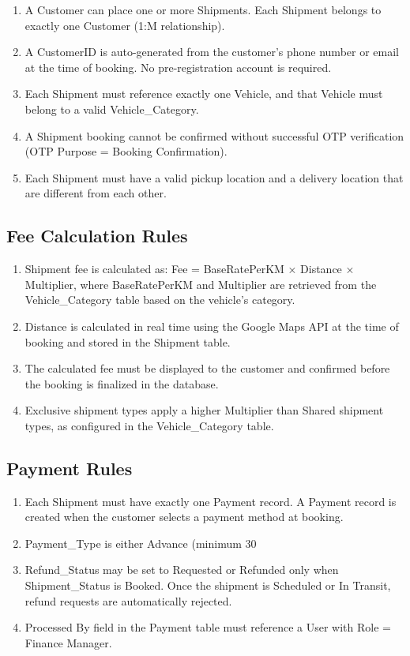 \documentclass[12pt,a4paper]{report}
\begin{document}
\begin{enumerate}
\item A Customer can place one or more Shipments. Each Shipment belongs to exactly one Customer (1:M relationship).
\item A CustomerID is auto-generated from the customer's phone number or email at the time of booking. No pre-registration account is required.
\item Each Shipment must reference exactly one Vehicle, and that Vehicle must belong to a valid Vehicle\_Category.
\item A Shipment booking cannot be confirmed without successful OTP verification (OTP Purpose = Booking Confirmation).
\item Each Shipment must have a valid pickup location and a delivery location that are different from each other.
\end{enumerate}
\subsection{Fee Calculation Rules}
\begin{enumerate}
    \item Shipment fee is calculated as: Fee = BaseRatePerKM × Distance × Multiplier, where BaseRatePerKM and Multiplier are retrieved from the Vehicle\_Category table based on the vehicle's category.
\item Distance is calculated in real time using the Google Maps API at the time of booking and stored in the Shipment table.
\item The calculated fee must be displayed to the customer and confirmed before the booking is finalized in the database.
\item Exclusive shipment types apply a higher Multiplier than Shared shipment types, as configured in the Vehicle\_Category table.

\end{enumerate}
\subsection{Payment Rules}
\begin{enumerate}
    \item Each Shipment must have exactly one Payment record. A Payment record is created when the customer selects a payment method at booking.
\item Payment\_Type is either Advance (minimum 30%
\item Refund\_Status may be set to Requested or Refunded only when Shipment\_Status is Booked. Once the shipment is Scheduled or In Transit, refund requests are automatically rejected.
\item Processed By field in the Payment table must reference a User with Role = Finance Manager.

\end{enumerate}
\end{document}
